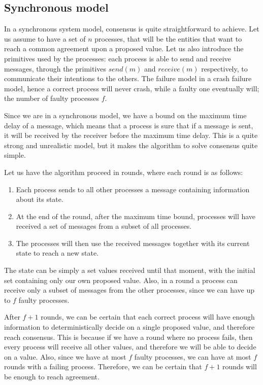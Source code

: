 \subsection{Synchronous model}\label{sec:Synchronous model}
In a synchronous system model, consensus is quite straightforward to achieve. Let us assume to have a set of $n$ processes, that will be the entities that want to reach a common agreement upon a proposed value. Let us also introduce the primitives used by the processes: each process is able to send and receive messages, through the primitives $send(m)$ and $receive(m)$ respectively, to communicate their intentions to the others. The failure model in a crash failure model, hence a correct process will never crash, while a faulty one eventually will; the number of faulty processes $f$.

Since we are in a synchronous model, we have a bound on the maximum time delay of a message, which means that a process is sure that if a message is sent, it will be received by the receiver before the maximum time delay. This is a quite strong and unrealistic model, but it makes the algorithm to solve consensus quite simple.

Let us have the algorithm proceed in rounds, where each round is as follows:
\begin{enumerate}
    \item Each process sends to all other processes a message containing information about its state.
    \item At the end of the round, after the maximum time bound, processes will have received a set of messages from a subset of all processes.
    \item The processes will then use the received messages together with its current state to reach a new state.
\end{enumerate}

The state can be simply a set values received until that moment, with the initial set containing only our own proposed value. Also, in a round a process can receive only a subset of messages from the other processes, since we can have up to $f$ faulty processes.

After $f+1$ rounds, we can be certain that each correct process will have enough information to deterministically decide on a single proposed value, and therefore reach consensus. This is because if we have a round where no process fails, then every process will receive all other values, and therefore we will be able to decide on a value. Also, since we have at most $f$ faulty processes, we can have at most $f$ rounds with a failing process. Therefore, we can be certain that $f+1$ rounds will be enough to reach agreement.

